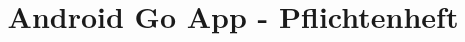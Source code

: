 \documentclass{report}
\begin{document}
	\title{Android Go App - Pflichtenheft}
	\maketitle
\end{document}
